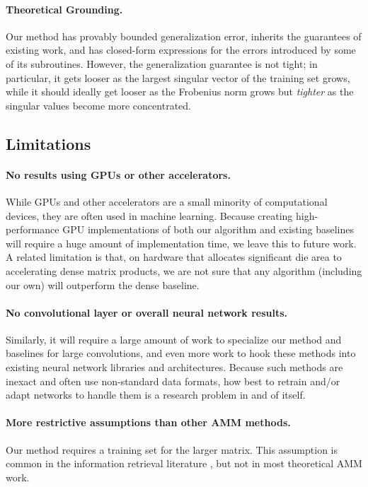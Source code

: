 \paragraph{Theoretical Grounding.}
Our method has provably bounded generalization error, inherits the guarantees of existing work, and has closed-form expressions for the errors introduced by some of its subroutines. However, the generalization guarantee is not tight; in particular, it gets looser as the largest singular vector of the training set grows, while it should ideally get looser as the Frobenius norm grows but \textit{tighter} as the singular values become more concentrated.

\subsection{Limitations}

\paragraph{No results using GPUs or other accelerators.} While GPUs and other accelerators are a small minority of computational devices, they are often used in machine learning. Because creating high-performance GPU implementations of both our algorithm and existing baselines will require a huge amount of implementation time, we leave this to future work. A related limitation is that, on hardware that allocates significant die area to accelerating dense matrix products, we are not sure that any algorithm (including our own) will outperform the dense baseline.

\paragraph{No convolutional layer or overall neural network results.} Similarly, it will require a large amount of work to specialize our method and baselines for large convolutions, and even more work to hook these methods into existing neural network libraries and architectures. Because such methods are inexact and often use non-standard data formats, how best to retrain and/or adapt networks to handle them is a research problem in and of itself.

\paragraph{More restrictive assumptions than other AMM methods.} Our method requires a training set for the larger matrix. This assumption is common in the information retrieval literature \cite{bolt,pairq,quip}, but not in most theoretical AMM work.

